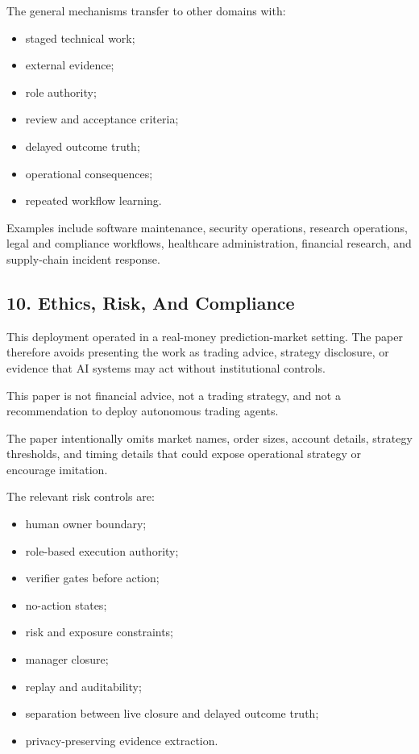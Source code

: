 \documentclass[
]{article}
\providecommand{\tightlist}{%
  \setlength{\itemsep}{0pt}\setlength{\parskip}{0pt}}
\begin{document}
The general mechanisms transfer to other domains with:

\begin{itemize}
\tightlist
\item
  staged technical work;
\item
  external evidence;
\item
  role authority;
\item
  review and acceptance criteria;
\item
  delayed outcome truth;
\item
  operational consequences;
\item
  repeated workflow learning.
\end{itemize}

Examples include software maintenance, security operations, research operations, legal and compliance workflows, healthcare administration, financial research, and supply-chain incident response.

\subsection{10. Ethics, Risk, And Compliance}\label{ethics-risk-and-compliance}

This deployment operated in a real-money prediction-market setting. The paper therefore avoids presenting the work as trading advice, strategy disclosure, or evidence that AI systems may act without institutional controls.

This paper is not financial advice, not a trading strategy, and not a recommendation to deploy autonomous trading agents.

The paper intentionally omits market names, order sizes, account details, strategy thresholds, and timing details that could expose operational strategy or encourage imitation.

The relevant risk controls are:

\begin{itemize}
\tightlist
\item
  human owner boundary;
\item
  role-based execution authority;
\item
  verifier gates before action;
\item
  no-action states;
\item
  risk and exposure constraints;
\item
  manager closure;
\item
  replay and auditability;
\item
  separation between live closure and delayed outcome truth;
\item
  privacy-preserving evidence extraction.
\end{itemize}
\end{document}
